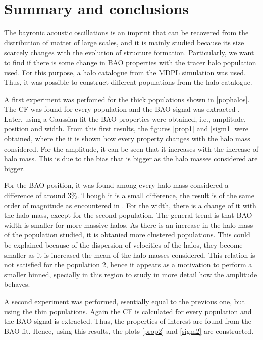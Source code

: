 \chapter{Summary and conclusions}


The bayronic acoustic oscillations is an imprint that can be recovered from the distribution of matter 
of large scales, and it is mainly studied because its size scarcely changes with the evolution of
structure formation. Particularly, we want to find if there is some change in BAO properties with 
the tracer halo population used.
For this purpose, a halo catalogue from the MDPL simulation was used.
Thus, it was possible to construct different populations from the halo catalogue.

A first experiment was perfomed for the thick populations shown in \ref{pophalos}.
The CF was found for every population and the BAO signal was extracted . 
Later, using a Gaussian fit the BAO properties were obtained, i.e., amplitude, position 
and width. 
From this first results, the figures \ref{prop1} and \ref{sigm1} were obtained, where
the it is shown how every property changes with the halo mass considered. 
For the amplitude, it can be seen that it increases with the increase of halo mass.
This is due to the bias that is bigger as the halo masses considered are bigger. 

For the BAO position, it was found among every halo mass considered a difference of around $3\%$.
Though it is a small difference, the result is of the same order of magnitude as encountered 
in \cite{motion}. 
For the width, there is a change of it with the halo mass, except for the second 
population. The general trend is that BAO width is smaller for more massive halos. As there is an increase in the halo mass of the population studied, it is obtanied
more clustered populations. This could be explained because of the dispersion of velocities of
the halos, they become smaller as it is increased the mean of the halo masses considered. 
This relation is not satisfied for the population $2$, hence it appears as a motivation to
perform a smaller binned, specially in this region to study in more detail how the 
amplitude behaves.
	
		
A second experiment was performed, esentially equal to the previous one, 
but using the thin populations. 
Again the CF is calculated for every population and the BAO signal is extracted. 
Thus, the properties of interest are found from the BAO fit. Hence, 
using this results, the plots \ref{prop2} and \ref{sigm2} are constructed. 


